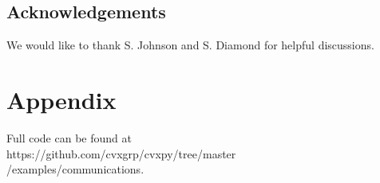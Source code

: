 \documentclass[twocolumn,secnumarabic,amssymb, nobibnotes, aps, prl,superscriptaddress]{revtex4-1}
\begin{document}

\subsection*{Acknowledgements}
We would like to thank S. Johnson and S. Diamond for helpful discussions.

\section*{Appendix}
Full code can be found at\\ https://github.com/cvxgrp/cvxpy/tree/master\\/examples/communications.

\vspace{1cm}
 


\end{document}
